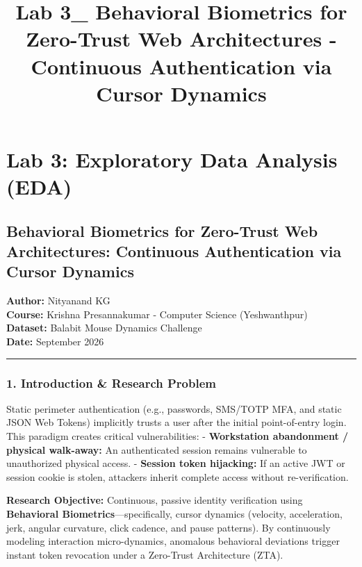 \documentclass[11pt]{article}
\title{Lab 3\_ Behavioral Biometrics for Zero-Trust Web Architectures - Continuous Authentication via Cursor Dynamics}
\begin{document}
    
    \maketitle
    
    

    
    \section{Lab 3: Exploratory Data Analysis
(EDA)}\label{lab-3-exploratory-data-analysis-eda}

\subsection{Behavioral Biometrics for Zero-Trust Web Architectures:
Continuous Authentication via Cursor
Dynamics}\label{behavioral-biometrics-for-zero-trust-web-architectures-continuous-authentication-via-cursor-dynamics}

\textbf{Author:} Nityanand KG\\
\textbf{Course:} Krishna Presannakumar - Computer Science
(Yeshwanthpur)\\
\textbf{Dataset:} Balabit Mouse Dynamics Challenge\\
\textbf{Date:} September 2026

\begin{center}\rule{0.5\linewidth}{0.5pt}\end{center}

\subsubsection{1. Introduction \& Research
Problem}\label{introduction-research-problem}

Static perimeter authentication (e.g., passwords, SMS/TOTP MFA, and
static JSON Web Tokens) implicitly trusts a user after the initial
point-of-entry login. This paradigm creates critical vulnerabilities: -
\textbf{Workstation abandonment / physical walk-away:} An authenticated
session remains vulnerable to unauthorized physical access. -
\textbf{Session token hijacking:} If an active JWT or session cookie is
stolen, attackers inherit complete access without re-verification.

\textbf{Research Objective:} Continuous, passive identity verification
using \textbf{Behavioral Biometrics}---specifically, cursor dynamics
(velocity, acceleration, jerk, angular curvature, click cadence, and
pause patterns). By continuously modeling interaction micro-dynamics,
anomalous behavioral deviations trigger instant token revocation under a
Zero-Trust Architecture (ZTA).
\end{document}
